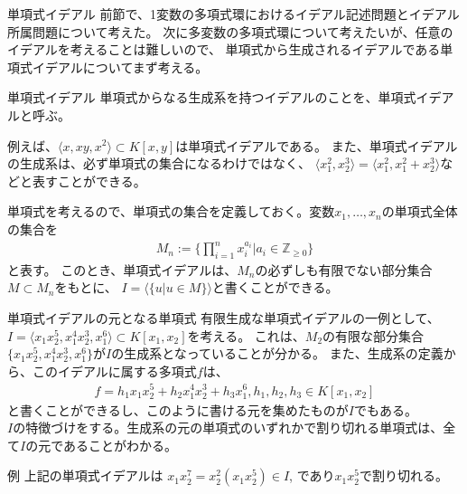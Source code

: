 \begin{frame} {単項式イデアル}
	前節で、1変数の多項式環におけるイデアル記述問題とイデアル所属問題について考えた。
	次に多変数の多項式環について考えたいが、任意のイデアルを考えることは難しいので、
	単項式から生成されるイデアルである単項式イデアルについてまず考える。
	\begin{definition} {単項式イデアル}
		単項式からなる生成系を持つイデアルのことを、単項式イデアルと呼ぶ。
	\end{definition}
	例えば、$\langle x, xy, x^2 \rangle \subset K[x,y]$は単項式イデアルである。
	また、単項式イデアルの生成系は、必ず単項式の集合になるわけではなく、
	$\langle x_1^2, x_2^3 \rangle = \langle x_1^2, x_1^2+x_2^3 \rangle$などと表すことができる。
\end{frame}

\begin{frame}
	単項式を考えるので、単項式の集合を定義しておく。変数$x_1, \ldots, x_n$の単項式全体の集合を
	\begin{align*}
		M_n := \{ \prod_{i=1}^n x_i^{a_i} | a_i \in \mathbb{Z}_{\geq 0} \}
	\end{align*}
	と表す。
	このとき、単項式イデアルは、$M_n$の必ずしも有限でない部分集合$M \subset M_n$をもとに、
	$I = \langle \{ u | u \in M \} \rangle$と書くことができる。
\end{frame}

\begin{frame} {単項式イデアルの元となる単項式}
	有限生成な単項式イデアルの一例として、$I = \langle x_1 x_2^5, x_1^4 x_2^3, x_1^6 \rangle \subset K[x_1, x_2]$を考える。
	これは、$M_2$の有限な部分集合$\{x_1 x_2^5, x_1^4 x_2^3, x_1^6\}$が$I$の生成系となっていることが分かる。
	また、生成系の定義から、このイデアルに属する多項式$f$は、
	\begin{align*}
		f = h_1 x_1 x_2^5 + h_2 x_1^4 x_2^3 + h_3 x_1^6, h_1, h_2, h_3 \in K[x_1, x_2]
	\end{align*}
	と書くことができるし、このように書ける元を集めたものが$I$でもある。\\
	$I$の特徴づけをする。生成系の元の単項式のいずれかで割り切れる単項式は、全て$I$の元であることがわかる。\\
	\begin{exampleblock} {例}
		上記の単項式イデアルは
		$x_1 x_2^7 = x_2^2 (x_1 x_2^5) \in I$, であり$x_1 x_2^5$で割り切れる。
	\end{exampleblock}
\end{frame}

